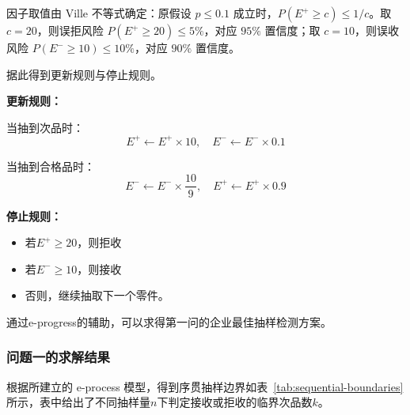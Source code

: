 \documentclass[withoutpreface,bwprint]{cumcmthesis}
\numberwithin{equation}{section}
\begin{document}
\begin{enumerate}[itemindent=2em]
\hspace{2em}因子取值由 Ville 不等式确定：原假设 $p\leq 0.1$ 成立时，$P(E^+\geq c)\leq 1/c$。取 $c=20$，则误拒风险 $P(E^+\geq 20)\leq 5\%$，对应 $95\%$ 置信度；取 $c=10$，则误收风险 $P(E^-\geq 10)\leq 10\%$，对应 $90\%$ 置信度。

\hspace{2em}据此得到更新规则与停止规则。

    \hspace{2em}
\textbf{更新规则：}

 \hspace{2em}当抽到次品时：
    \begin{equation}
        E^+ \leftarrow E^+ \times 10, \quad E^- \leftarrow E^- \times 0.1
    \end{equation}

    \hspace{2em}当抽到合格品时：
    \begin{equation}
        E^- \leftarrow E^- \times \frac{10}{9}, \quad E^+ \leftarrow E^+ \times 0.9
    \end{equation}

    \hspace{2em}\textbf{停止规则：}

    \begin{itemize}[leftmargin=4em]
        \item 若$E^+ \geq 20$，则拒收
        \item 若$E^- \geq 10$，则接收
        \item 否则，继续抽取下一个零件。
    \end{itemize}

\end{enumerate}


通过e-progress的辅助，可以求得第一问的企业最佳抽样检测方案。











\subsubsection{问题一的求解结果}

根据所建立的 e-process 模型，得到序贯抽样边界如表~\ref{tab:sequential-boundaries}所示，表中给出了不同抽样量$n$下判定接收或拒收的临界次品数$k$。
\end{document}
